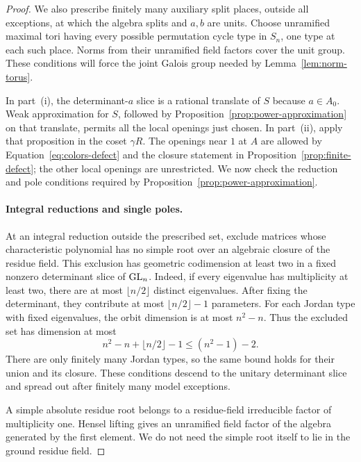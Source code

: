 \begin{proof}
We also prescribe finitely many auxiliary split places, outside all
exceptions, at which the algebra splits and $a,b$ are units.  Choose
unramified maximal tori having every possible permutation cycle type in
$S_n$, one type at each such place.  Norms from their unramified field
factors cover the unit group.  These conditions will force the joint
Galois group needed by Lemma~\ref{lem:norm-torus}.

In part~\textup{(i)}, the determinant-$a$ slice is a rational translate
of $S$ because $a\in A_0$.  Weak approximation for $S$, followed by
Proposition~\ref{prop:power-approximation} on that translate, permits all
the local openings just chosen.  In part~\textup{(ii)}, apply that
proposition in the coset $\gamma R$.  The openings near $1$ at $A$ are
allowed by Equation~\eqref{eq:colors-defect} and the closure statement
in Proposition~\ref{prop:finite-defect}; the other local openings are
unrestricted.  We now check the reduction and pole conditions required
by Proposition~\ref{prop:power-approximation}.

\paragraph{Integral reductions and single poles.}
At an integral reduction outside the prescribed set, exclude matrices
whose characteristic polynomial has no simple root over an algebraic
closure of the residue field.  This exclusion has geometric codimension
at least two in a fixed nonzero determinant slice of $\operatorname{GL}_n$.
Indeed, if every eigenvalue has multiplicity at least two, there are at
most $\lfloor n/2\rfloor$ distinct eigenvalues.  After fixing the
determinant, they contribute at most $\lfloor n/2\rfloor-1$ parameters.
For each Jordan type with fixed eigenvalues, the orbit dimension is at
most $n^2-n$.  Thus the excluded set has dimension at most
\[
 n^2-n+\lfloor n/2\rfloor-1
 \leq (n^2-1)-2.
\]
There are only finitely many Jordan types, so the same bound holds for
their union and its closure.  These conditions descend to the unitary
determinant slice and spread out after finitely many model exceptions.

A simple absolute residue root belongs to a residue-field irreducible
factor of multiplicity one.  Hensel lifting gives an unramified field
factor of the algebra generated by the first element.  We do not need
the simple root itself to lie in the ground residue field.


\end{proof}

